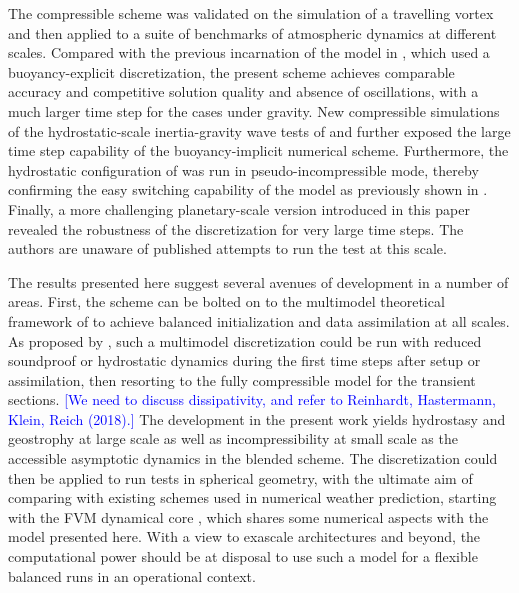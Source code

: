 \documentclass{ametsoc}
\theoremstyle{definition}
\newcommand{\klein}[1]{\textcolor{blue}{#1}}
\begin{document}
The compressible scheme was validated on the simulation of a travelling vortex and then applied to a suite of benchmarks of atmospheric dynamics at different scales. Compared with the previous incarnation of the model in \cite{Benacchio2014, BenacchioEtAl2014}, which used a buoyancy-explicit discretization, the present scheme achieves comparable accuracy and competitive solution quality and absence of oscillations, with a much larger time step for the cases under gravity. New compressible simulations of the hydrostatic-scale inertia-gravity wave tests of \cite{BaldaufBrdar2013} and \cite{SkamarockKlemp1994} further exposed the large time step capability of the buoyancy-implicit numerical scheme. Furthermore, the hydrostatic configuration of \cite{SkamarockKlemp1994} was run in pseudo-incompressible mode, thereby confirming the easy switching capability of the model as previously shown in \cite{BenacchioEtAl2014, KleinBenacchio2016}. Finally, a more challenging planetary-scale version introduced in this paper revealed the robustness of the discretization for very large time steps. The authors are unaware of published attempts to run the test at this scale.

The results presented here suggest several avenues of development in a number of areas. First, the scheme can be bolted on to the multimodel theoretical framework of \cite{KleinBenacchio2016} to achieve balanced initialization and data assimilation at all scales. As proposed by \cite{BenacchioEtAl2014}, such a multimodel discretization could be run with reduced soundproof or hydrostatic dynamics during the first time steps after setup or assimilation, then resorting to the fully compressible model for the transient sections. \klein{[We need to discuss dissipativity, and refer to Reinhardt, Hastermann, Klein, Reich (2018).]} The development in the present work yields hydrostasy and geostrophy at large scale as well as incompressibility at small scale as the accessible asymptotic dynamics in the blended scheme. The discretization could then be applied to run tests in spherical geometry, with the ultimate aim of comparing with existing schemes used in numerical weather prediction, starting with the FVM dynamical core \citep{KuehnleinEtAl2019}, which shares some numerical aspects with the model presented here. With a view to exascale architectures and beyond, the computational power should be at disposal to use such a model for a flexible balanced runs in an operational context.
\end{document}
